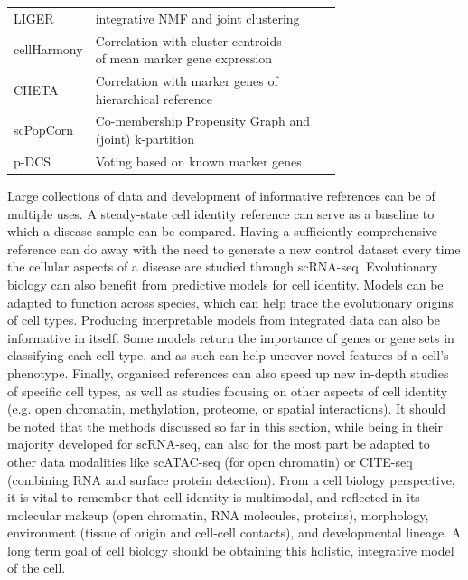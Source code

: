 \begin{table}[p]
\begin{tabular}{l|l|c}
LIGER & integrative NMF and joint clustering & ~\citep{welch_single-cell_2019}\\

cellHarmony & \specialcell[t]{Correlation with cluster centroids\\of mean marker gene expression} & ~\citep{depasquale_cellharmony:_2019}\\

CHETA & \specialcell[t]{Correlation with marker genes of\\hierarchical reference} & ~\citep{de_kanter_chetah:_2019}\\

scPopCorn & \specialcell[t]{Co-membership Propensity Graph and\\(joint) k-partition} & ~\citep{wang_subpopulation_2019}\\

p-DCS & Voting based on known marker genes & ~\citep{domanskyi_polled_2019}\\

\bottomrule
\end{tabular}
\end{table}

Large collections of data and development of informative references can be of multiple uses. A steady-state cell identity reference can serve as a baseline to which a disease sample can be compared. Having a sufficiently comprehensive reference can do away with the need to generate a new control dataset every time the cellular aspects of a disease are studied through scRNA-seq. Evolutionary biology can also benefit from predictive models for cell identity. Models can be adapted to function across species, which can help trace the evolutionary origins of cell types. Producing interpretable models from integrated data can also be informative in itself. Some models return the importance of genes or gene sets in classifying each cell type, and as such can help uncover novel features of a cell's phenotype. Finally, organised references can also speed up new in-depth studies of specific cell types, as well as studies focusing on other aspects of cell identity (e.g. open chromatin, methylation, proteome, or spatial interactions). It should be noted that the methods discussed so far in this section, while being in their majority developed for scRNA-seq, can also for the most part be adapted to other data modalities like scATAC-seq (for open chromatin) or CITE-seq (combining RNA and surface protein detection). From a cell biology perspective, it is vital to remember that cell identity is multimodal, and reflected in its molecular makeup (open chromatin, RNA molecules, proteins), morphology, environment (tissue of origin and cell-cell contacts), and developmental lineage. A long term goal of cell biology should be obtaining this holistic, integrative model of the cell.


